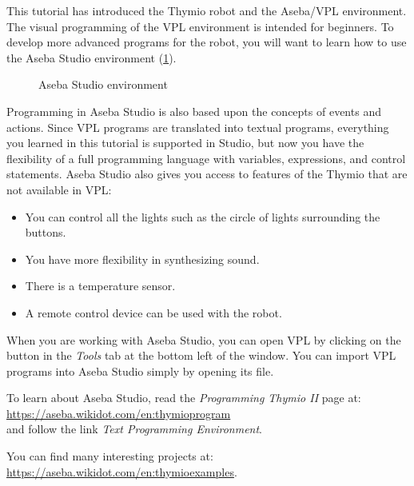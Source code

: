 
\label{ch.next}

This tutorial has introduced the Thymio robot and the Aseba/VPL
environment. The visual programming of the VPL environment is intended
for beginners. To develop more advanced programs for the robot, you will
want to learn how to use the Aseba Studio environment
(\cref{fig.studio}).

\begin{figure}[hbt]
\begin{center}
\caption{Aseba Studio environment}\label{fig.studio}
\end{center}
\end{figure}

Programming in Aseba Studio is also based upon the concepts of events
and actions. Since VPL programs are translated into textual programs,
everything you learned in this tutorial is supported in Studio, but now
you have the flexibility of a full programming language with variables,
expressions, and control statements. Aseba Studio also gives you access
to features of the Thymio that are not available in VPL:

\begin{itemize}
\item You can control all the lights such as the circle of lights
surrounding the buttons.
\item You have more flexibility in synthesizing sound.
\item There is a temperature sensor.
\item A remote control device can be used with the robot.
\end{itemize}

When you are working with Aseba Studio, you can open VPL by clicking on
the button  in the \emph{Tools} tab at the bottom left of
the window. You can import VPL programs into Aseba Studio simply by
opening its file.

To learn about Aseba Studio, read the \emph{Programming Thymio II} page at:\\
\url{https://aseba.wikidot.com/en:thymioprogram}\\
and follow the link \emph{Text Programming Environment}.

You can find many interesting projects at:\\ \url{https://aseba.wikidot.com/en:thymioexamples}.

\vspace{4em}


